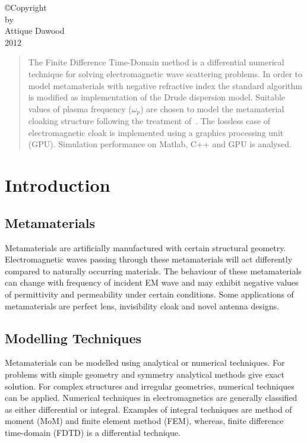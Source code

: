 \documentclass[10pt,A4paper]{report}
\begin{document}


\begin{center}
\copyright Copyright\\[0.2in]
by\\[0.2in]
Attique Dawood\\[0.2in]
2012
\end{center}



\tableofcontents
\listoffigures

\begin{abstract}
The Finite Difference Time-Domain method is a differential numerical technique for solving electromagnetic wave scattering problems. In order to model metamaterials with negative refractive index the standard algorithm is modified as implementation of the Drude dispersion model. Suitable values of plasma frequency ($\omega_p$) are chosen to model the metamaterial cloaking structure following the treatment of~\cite{Radial-Zhao}. The lossless case of electromagnetic cloak is implemented using a graphics processing unit (GPU). Simulation performance on Matlab, C++ and GPU is analysed.
\end{abstract}

\chapter{Introduction}
\section{Metamaterials}
Metamaterials are artificially manufactured with certain structural geometry. Electromagnetic waves passing through these metamaterials will act differently compared to naturally occurring materials. The behaviour of these metamaterials can change with frequency of incident EM wave and may exhibit negative values of permittivity and permeability under certain conditions. Some applications of metamaterials are perfect lens, invisibility cloak and novel antenna designs.

\section{Modelling Techniques}
Metamaterials can be modelled using analytical or numerical techniques. For problems with simple geometry and symmetry analytical methods give exact solution. For complex structures and irregular geometries, numerical techniques can be applied. Numerical techniques in electromagnetics are generally classified as either differential or integral. Examples of integral techniques are method of moment (MoM) and finite element method (FEM), whereas, finite difference time-domain (FDTD) is a differential technique.
\end{document}
